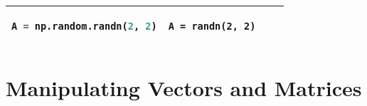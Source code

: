 \documentclass[10pt, landscape]{article}
\begin{document}
\begin{multicols}{2}
\begin{tabular}[]{@{}llll@{}}
\begin{minipage}[t]{0.25\columnwidth}
\begin{lstlisting}[language=Python]
A = np.random.randn(2, 2)
\end{lstlisting}
\strut
\end{minipage} & \begin{minipage}[t]{0.20\columnwidth}\raggedright\strut
\begin{lstlisting}
A = randn(2, 2)
\end{lstlisting}
\strut
\end{minipage}\tabularnewline
\bottomrule
\end{tabular}

\section{Manipulating Vectors and
Matrices}\label{manipulating-vectors-and-matrices}


\end{multicols}
\end{document}

